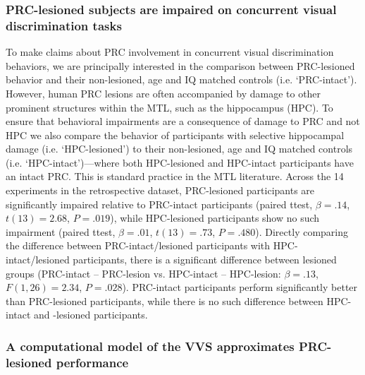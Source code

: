 \documentclass[11pt]{article}
\begin{document}
\subsubsection{PRC-lesioned subjects are impaired on concurrent visual discrimination tasks}

To make claims about PRC involvement in concurrent visual discrimination behaviors, we are principally interested in the comparison between PRC-lesioned behavior and their non-lesioned, age and IQ matched controls (i.e. `PRC-intact'). However, human PRC lesions are often accompanied by damage to other prominent structures within the MTL, such as the hippocampus (HPC). To ensure that behavioral impairments are a consequence of damage to PRC and not HPC we also compare the behavior of participants with selective hippocampal damage (i.e. `HPC-lesioned') to their non-lesioned, age and IQ matched controls (i.e. `HPC-intact')---where both HPC-lesioned and HPC-intact participants have an intact PRC. This is standard practice in the MTL literature. Across the 14 experiments in the retrospective dataset, PRC-lesioned participants are significantly impaired relative to PRC-intact participants (paired ttest, $\beta = .14$, $t(13) = 2.68$, $P = .019$), while HPC-lesioned participants show no such impairment (paired ttest, $\beta = .01$, $t(13) = .73$, $P = .480$). Directly comparing the difference between PRC-intact/lesioned participants with HPC-intact/lesioned participants, there is a significant difference between lesioned groups (PRC-intact -- PRC-lesion vs. HPC-intact -- HPC-lesion: $\beta = .13$, $F(1, 26) = 2.34$, $P = .028$). PRC-intact participants perform significantly better than PRC-lesioned participants, while there is no such difference between HPC-intact and -lesioned participants. 

\subsubsection{A computational model of the VVS approximates PRC-lesioned performance}
\end{document}
